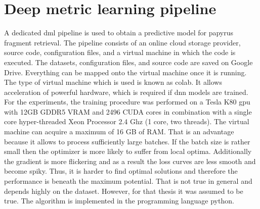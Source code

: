 \section{Deep metric learning pipeline}
\label{sec:pipeline}
A dedicated \ac{dml} pipeline is used to obtain a predictive model for papyrus fragment retrieval. The pipeline consists of an online cloud storage provider, source code, configuration files, and a virtual machine in which the code is executed. The datasets, configuration files, and source code are saved on Google Drive. Everything can be mapped onto the virtual machine once it is running. The type of virtual machine which is used is known as \ac{colab}. It allows acceleration of powerful hardware, which is required if \ac{dnn} models are trained. For the experiments, the training procedure was performed on a Tesla K80 \ac{gpu} with 12GB GDDR5 VRAM and 2496 CUDA cores in combination with a single core hyper-threaded Xeon Processor \@2.4 Ghz (1 core, two threads). The virtual machine can acquire a maximum of 16 GB of RAM. That is an advantage because it allows to process sufficiently large batches. If the batch size is rather small then the optimizer is more likely to suffer from local optima. Additionally the gradient is more flickering and as a result the loss curves are less smooth and become spiky. Thus, it is harder to find optimal solutions and therefore the performance is beneath the maximum potential. That is not true in general and depends highly on the dataset. However, for that thesis it was assumed to be true. The algorithm is implemented in the programming language python.\\
